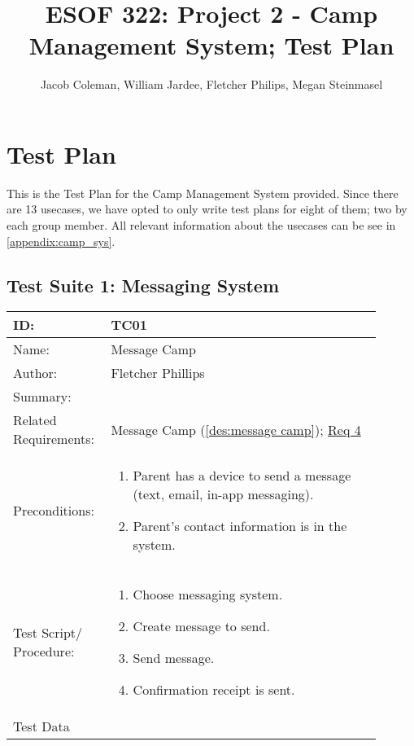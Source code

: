 \documentclass[11pt]{article}
\begin{document}
\title{ESOF 322: Project 2 - Camp Management System; Test Plan}
\author{Jacob Coleman, William Jardee, Fletcher Philips, Megan Steinmasel}
\maketitle




\section*{Test Plan}

This is the Test Plan for the Camp Management System provided. Since there are 13 usecases, we have opted to only write test plans for eight of them; two by each group member. All relevant information about the usecases can be see in \cref{appendix:camp_sys}.


\clearpage

\subsection*{Test Suite 1: Messaging System}

\begin{table}[H]
\begin{center}
\begin{tabular}{p{0.20\linewidth}p{0.70\linewidth}}
	ID: & TC01\\\hline
	Name: & Message Camp \\\hline
	Author: & Fletcher Phillips\\\hline
	Summary: &  \\\hline
	Related \hspace{5em} Requirements:& Message Camp (\cref{des:message camp}); \hyperlink{Req4}{Req 4} \\\hline
	Preconditions:& \begin{enumerate}[topsep=0pt]
		\item Parent has a device to send a message (text, email, in-app messaging).
		\item Parent's contact information is in the system.
	\end{enumerate}\\\hline
	Test Script/ Procedure: & \begin{enumerate}[topsep=0pt]
		\item Choose messaging system.
		\item Create message to send.
		\item Send message.
		\item Confirmation receipt is sent.
	\end{enumerate}\\\hline
	Test Data & 
\end{tabular}
\label{TC01}	
\end{center}
\end{table}
\end{document}
